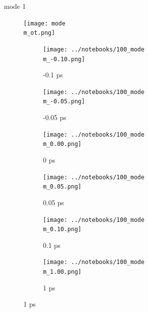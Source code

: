 \documentclass{beamer}
\begin{document}
\renewcommand\m{1}
\begin{frame}{mode \m}
	\vspace{\vh mm}
	\begin{figure}
		\centering
		\texttt{[image: mode\\m\_ot.png]}
	\end{figure}
	\begin{figure}
		\centering
		\begin{subfigure}[b]{\w\textwidth}
			\centering
			\texttt{[image: ../notebooks/100\_mode\\m\_-0.10.png]}
			\caption{-0.1 ps}
		\end{subfigure}
		\begin{subfigure}[b]{\w\textwidth}
			\centering
			\texttt{[image: ../notebooks/100\_mode\\m\_-0.05.png]}
			\caption{-0.05 ps}
		\end{subfigure}
		\begin{subfigure}[b]{\w\textwidth}
			\centering
			\texttt{[image: ../notebooks/100\_mode\\m\_0.00.png]}
			\caption{0 ps}
		\end{subfigure}
		\begin{subfigure}[b]{\w\textwidth}
			\centering
			\texttt{[image: ../notebooks/100\_mode\\m\_0.05.png]}
			\caption{0.05 ps}
		\end{subfigure}
		\begin{subfigure}[b]{\w\textwidth}
			\centering
			\texttt{[image: ../notebooks/100\_mode\\m\_0.10.png]}
			\caption{0.1 ps}
		\end{subfigure}
		\begin{subfigure}[b]{\w\textwidth}
			\centering
			\texttt{[image: ../notebooks/100\_mode\\m\_1.00.png]}
			\caption{1 ps}
		\end{subfigure}
	\end{figure}
\end{frame}

\renewcommand\m{2}
\end{document}
